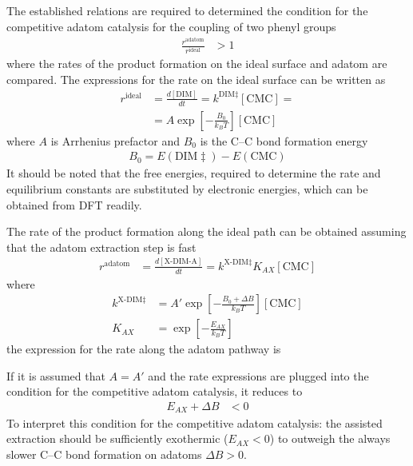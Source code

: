 \documentclass[aps,prl,reprint,amsmath,amssymb,floatfix,notitlepage]{revtex4-1}
\begin{document}
The established relations are required to determined the condition for the competitive adatom catalysis for the coupling of two phenyl groups 
%
\begin{equation}
\begin{split}
\frac{r^{\text{adatom}} }{ r^{\text{ideal}} } &> 1
\end{split}
\end{equation}
%
where the rates of the product formation on the ideal surface and adatom are compared. The expressions for the rate on the ideal surface can be written as
%
\begin{equation}
\begin{split}
r^{\text{ideal}} &= \frac{d[\text{DIM}]}{dt} = k^{\text{DIM}\ddagger} [\text{CMC}]  = \\
&= A \exp\left[ -\frac{B_0}{k_B T} \right] [\text{CMC}] 
\end{split}
\end{equation}
%
where $A$ is Arrhenius prefactor and $B_0$ is the C--C bond formation energy
%
\begin{equation}
\begin{split}
B_0 = E(\text{DIM}\ddagger) - E(\text{CMC}) 
\end{split}
\end{equation}
%
It should be noted that the free energies, required to determine the rate and equilibrium constants are substituted by electronic energies, which can be obtained from DFT readily.

The rate of the product formation along the ideal path can be obtained assuming that the adatom extraction step is fast
%
\begin{equation}
\begin{split}
r^{\text{adatom}} &= \frac{d[\text{X-DIM-A}]}{dt} = k^{\text{X-DIM}\ddagger} K_{AX} [\text{CMC}] 
\end{split}
\end{equation}
%
where
%
\begin{equation}
\begin{split}
k^{\text{X-DIM}\ddagger} &= A' \exp\left[ -\frac{B_0+\Delta B}{k_B T} \right] [\text{CMC}] \\
K_{AX} &= \exp\left[ -\frac{E_{AX}}{k_B T} \right] 
\end{split}
\end{equation}
%
the expression for the rate along the adatom pathway is 

If it is assumed that $A=A'$ and the rate expressions are plugged into the condition for the competitive adatom catalysis, it reduces to
%
\begin{equation}
\begin{split}
E_{AX} + \Delta B &< 0
\end{split}
\end{equation}
%
To interpret this condition for the competitive adatom catalysis: the assisted extraction should be sufficiently exothermic ($E_{AX} < 0$) to outweigh the always slower C--C bond formation on adatoms $\Delta B > 0$.
\end{document}
